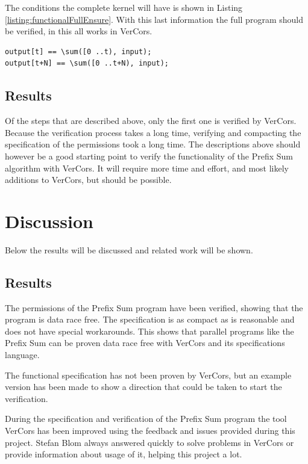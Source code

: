 \documentclass[a4paper]{article}
\begin{document}
The conditions the complete kernel will have is shown in Listing \ref{listing:functionalFullEnsure}. With this last information the full program should be verified, in this all works in VerCors.

\begin{lstlisting}[caption={Ensures clause of the kernel, verifying the output array results}, label=listing:functionalThreadEnsure, float=htpb]
output[t] == \sum([0 ..t), input);
output[t+N] == \sum([0 ..t+N), input);
\end{lstlisting}

\subsection{Results}
Of the steps that are described above, only the first one is verified by VerCors. Because the verification process takes a long time, verifying and compacting the specification of the permissions took a long time. The descriptions above should however be a good starting point to verify the functionality of the Prefix Sum algorithm with VerCors. It will require more time and effort, and most likely additions to VerCors, but should be possible.




\section{Discussion}\label{chapter:discussion}
Below the results will be discussed and related work will be shown.

\subsection{Results}
The permissions of the Prefix Sum program have been verified, showing that the program is data race free. The specification is as compact as is reasonable and does not have special workarounds. This shows that parallel programs like the Prefix Sum can be proven data race free with VerCors and its specifications language.

The functional specification has not been proven by VerCors, but an example version has been made to show a direction that could be taken to start the verification.

During the specification and verification of the Prefix Sum program the tool VerCors has been improved using the feedback and issues provided during this project. Stefan Blom always answered quickly to solve problems in VerCors or provide information about usage of it, helping this project a lot.
\end{document}
